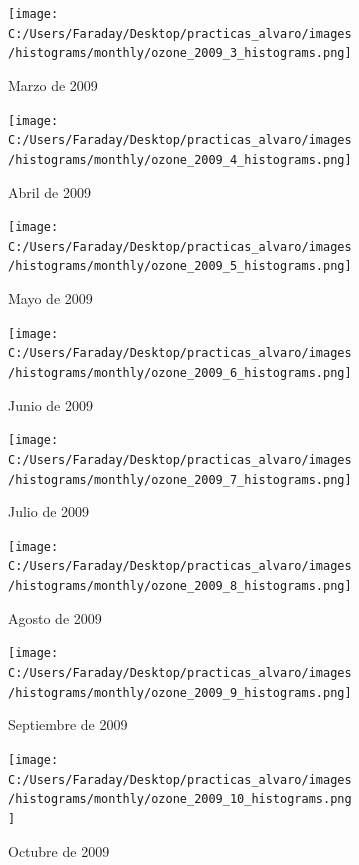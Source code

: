 \documentclass[12pt]{article}
\begin{document}
\begin{figure}[H]
\centering
\begin{subfigure}[h]{0.45\textwidth}
\texttt{[image: C:/Users/Faraday/Desktop/practicas\_alvaro/images/histograms/monthly/ozone\_2009\_3\_histograms.png]}
\caption{Marzo de 2009}
\label{fig:hist-mon-2-3-2009}
\end{subfigure}
%
\begin{subfigure}[H]{0.45\textwidth}
\texttt{[image: C:/Users/Faraday/Desktop/practicas\_alvaro/images/histograms/monthly/ozone\_2009\_4\_histograms.png]}
\caption{Abril de 2009}
\label{fig:hist-mon-2-4-2009}
\end{subfigure}
\caption{}
\end{figure}

\begin{figure}[H]
\centering
\begin{subfigure}[h]{0.45\textwidth}
\texttt{[image: C:/Users/Faraday/Desktop/practicas\_alvaro/images/histograms/monthly/ozone\_2009\_5\_histograms.png]}
\caption{Mayo de 2009}
\label{fig:hist-mon-2-5-2009}
\end{subfigure}
%
\begin{subfigure}[H]{0.45\textwidth}
\texttt{[image: C:/Users/Faraday/Desktop/practicas\_alvaro/images/histograms/monthly/ozone\_2009\_6\_histograms.png]}
\caption{Junio de 2009}
\label{fig:hist-mon-2-6-2009}
\end{subfigure}
\caption{}
\end{figure}

\newpage

\begin{figure}[H]
\centering
\begin{subfigure}[h]{0.45\textwidth}
\texttt{[image: C:/Users/Faraday/Desktop/practicas\_alvaro/images/histograms/monthly/ozone\_2009\_7\_histograms.png]}
\caption{Julio de 2009}
\label{fig:hist-mon-2-7-2009}
\end{subfigure}
%
\begin{subfigure}[H]{0.45\textwidth}
\texttt{[image: C:/Users/Faraday/Desktop/practicas\_alvaro/images/histograms/monthly/ozone\_2009\_8\_histograms.png]}
\caption{Agosto de 2009}
\label{fig:hist-mon-2-8-2009}
\end{subfigure}
\caption{}
\end{figure}

\begin{figure}[H]
\centering
\begin{subfigure}[h]{0.45\textwidth}
\texttt{[image: C:/Users/Faraday/Desktop/practicas\_alvaro/images/histograms/monthly/ozone\_2009\_9\_histograms.png]}
\caption{Septiembre de 2009}
\label{fig:hist-mon-2-9-2009}
\end{subfigure}
%
\begin{subfigure}[H]{0.45\textwidth}
\texttt{[image: C:/Users/Faraday/Desktop/practicas\_alvaro/images/histograms/monthly/ozone\_2009\_10\_histograms.png]}
\caption{Octubre de 2009}
\label{fig:hist-mon-2-10-2009}
\end{subfigure}
\caption{}
\end{figure}
\end{document}
